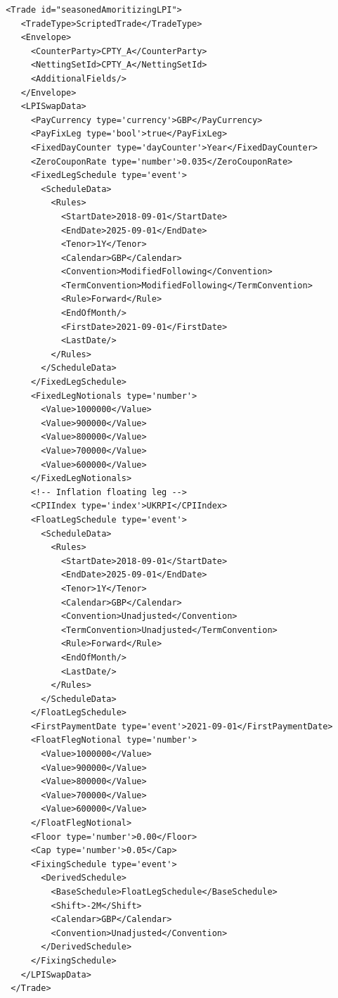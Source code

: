 \begin{verbatim}
 <Trade id="seasonedAmoritizingLPI">
    <TradeType>ScriptedTrade</TradeType>
    <Envelope>
      <CounterParty>CPTY_A</CounterParty>
      <NettingSetId>CPTY_A</NettingSetId>
      <AdditionalFields/>
    </Envelope>
    <LPISwapData>
      <PayCurrency type='currency'>GBP</PayCurrency>
      <PayFixLeg type='bool'>true</PayFixLeg>
      <FixedDayCounter type='dayCounter'>Year</FixedDayCounter>
      <ZeroCouponRate type='number'>0.035</ZeroCouponRate>
      <FixedLegSchedule type='event'>
        <ScheduleData>
          <Rules>
            <StartDate>2018-09-01</StartDate>
            <EndDate>2025-09-01</EndDate>
            <Tenor>1Y</Tenor>
            <Calendar>GBP</Calendar>
            <Convention>ModifiedFollowing</Convention>
            <TermConvention>ModifiedFollowing</TermConvention>
            <Rule>Forward</Rule>
            <EndOfMonth/>
            <FirstDate>2021-09-01</FirstDate>
            <LastDate/>
          </Rules>
        </ScheduleData>
      </FixedLegSchedule>
      <FixedLegNotionals type='number'>
        <Value>1000000</Value>
        <Value>900000</Value>
        <Value>800000</Value>
        <Value>700000</Value>
        <Value>600000</Value>
      </FixedLegNotionals>
      <!-- Inflation floating leg -->
      <CPIIndex type='index'>UKRPI</CPIIndex>
      <FloatLegSchedule type='event'>
        <ScheduleData>
          <Rules>
            <StartDate>2018-09-01</StartDate>
            <EndDate>2025-09-01</EndDate>
            <Tenor>1Y</Tenor>
            <Calendar>GBP</Calendar>
            <Convention>Unadjusted</Convention>
            <TermConvention>Unadjusted</TermConvention>
            <Rule>Forward</Rule>
            <EndOfMonth/>
            <LastDate/>
          </Rules>
        </ScheduleData>
      </FloatLegSchedule>
      <FirstPaymentDate type='event'>2021-09-01</FirstPaymentDate>
      <FloatFlegNotional type='number'>
        <Value>1000000</Value>
        <Value>900000</Value>
        <Value>800000</Value>
        <Value>700000</Value>
        <Value>600000</Value>
      </FloatFlegNotional>
      <Floor type='number'>0.00</Floor>
      <Cap type='number'>0.05</Cap>
      <FixingSchedule type='event'>
        <DerivedSchedule>
          <BaseSchedule>FloatLegSchedule</BaseSchedule>
          <Shift>-2M</Shift>
          <Calendar>GBP</Calendar>
          <Convention>Unadjusted</Convention>
        </DerivedSchedule>
      </FixingSchedule>
    </LPISwapData>
  </Trade>
\end{verbatim}

